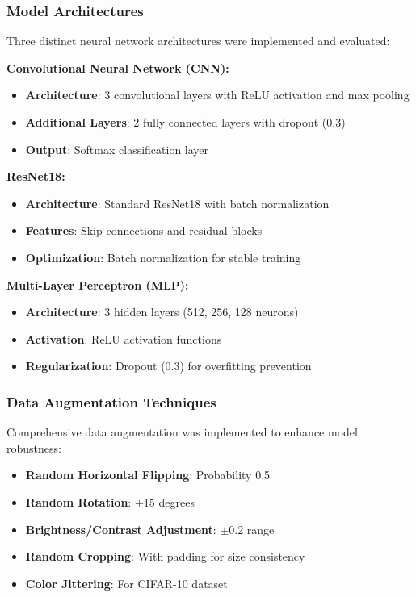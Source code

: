 \documentclass{ieeeaccess}
\begin{document}
\subsubsection{Model Architectures}
Three distinct neural network architectures were implemented and evaluated:

\textbf{Convolutional Neural Network (CNN):}
\begin{itemize}
\item \textbf{Architecture}: 3 convolutional layers with ReLU activation and max pooling
\item \textbf{Additional Layers}: 2 fully connected layers with dropout (0.3)
\item \textbf{Output}: Softmax classification layer
\end{itemize}

\textbf{ResNet18:}
\begin{itemize}
\item \textbf{Architecture}: Standard ResNet18 with batch normalization
\item \textbf{Features}: Skip connections and residual blocks
\item \textbf{Optimization}: Batch normalization for stable training
\end{itemize}

\textbf{Multi-Layer Perceptron (MLP):}
\begin{itemize}
\item \textbf{Architecture}: 3 hidden layers (512, 256, 128 neurons)
\item \textbf{Activation}: ReLU activation functions
\item \textbf{Regularization}: Dropout (0.3) for overfitting prevention
\end{itemize}

\subsubsection{Data Augmentation Techniques}
Comprehensive data augmentation was implemented to enhance model robustness:
\begin{itemize}
\item \textbf{Random Horizontal Flipping}: Probability 0.5
\item \textbf{Random Rotation}: $\pm$15 degrees
\item \textbf{Brightness/Contrast Adjustment}: $\pm$0.2 range
\item \textbf{Random Cropping}: With padding for size consistency
\item \textbf{Color Jittering}: For CIFAR-10 dataset
\end{itemize}
\end{document}
